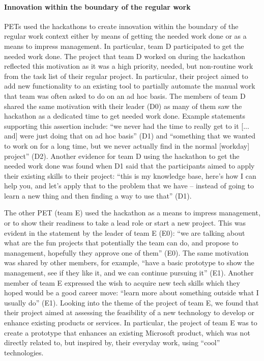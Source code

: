 \documentclass{hcij}
\begin{document}
\paragraph{Innovation within the boundary of the regular work}
PETs used the hackathons to create innovation within the boundary of the regular work context either by means of getting the needed work done or as a means to impress management. In particular, team D participated to get the needed work done. The project that team D worked on during the hackathon reflected this motivation as it was a high priority, needed, but non-routine work from the task list of their regular project. In particular, their project aimed to add new functionality to an existing tool to partially automate the manual work that team was often asked to do on an ad hoc basis. The members of team D shared the same motivation with their leader (D0) as many of them saw the hackathon as a dedicated time to get needed work done. Example statements supporting this assertion include: “we never had the time to really get to it [... and] were just doing that on ad hoc basis” (D1) and “something that we wanted to work on for a long time, but we never actually find in the normal [workday] project” (D2). Another evidence for team D using the hackathon to get the needed work done was found when D1 said that the participants aimed to apply their existing skills to their project: “this is my knowledge base, here's how I can help you, and let's apply that to the problem that we have – instead of going to learn a new thing and then finding a way to use that” (D1).

The other PET (team E) used the hackathon as a means to impress management, or to show their readiness to take a lead role or start a new project. This was evident in the statement by the leader of team E (E0): “we are talking about what are the fun projects that potentially the team can do, and propose to management, hopefully they approve one of them” (E0). The same motivation was shared by other members, for example, “have a basic prototype to show the management, see if they like it, and we can continue pursuing it” (E1). Another member of team E expressed the wish to acquire new tech skills which they hoped would be a good career move: “learn more about something outside what I usually do” (E1). Looking into the theme of the project of team E, we found that their project aimed at assessing the feasibility of a new technology to develop or enhance existing products or services. In particular, the project of team E was to create a prototype that enhances an existing Microsoft product, which was not directly related to, but inspired by, their everyday work, using “cool” technologies.
\end{document}
